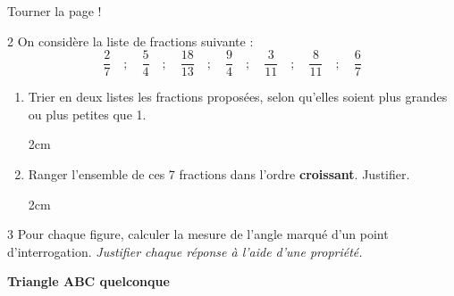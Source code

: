\documentclass[a4paper]{book}
\begin{document}
{\vfill \hfill Tourner la page !
\newpage


    \begin{exerciceNote}{2}
        On considère la liste de fractions suivante :
        \[ \frac{2}{7} \quad ; \quad \frac{5}{4} \quad ; \quad \frac{18}{13} \quad ; \quad \frac{9}{4} \quad ; \quad \frac{3}{11} \quad ; \quad \frac{8}{11} \quad ; \quad \frac{6}{7} \]
        
        \begin{enumerate}[leftmargin=*]
            \item Trier en deux listes les fractions proposées, selon qu'elles soient plus grandes ou plus petites que 1.

            \begin{ZoneReponse}{2cm}
            \end{ZoneReponse}
            
            \item Ranger l'ensemble de ces 7 fractions dans l'ordre \textbf{croissant}. Justifier.

            \begin{ZoneReponse}{2cm}
            \end{ZoneReponse}
        \end{enumerate}
    \end{exerciceNote}


    \begin{exerciceNote}{3}
        Pour chaque figure, calculer la mesure de l'angle marqué d'un point d'interrogation. \textit{Justifier chaque réponse à l'aide d'une propriété.}

        \vspace{1cm}

        \begin{minipage}{0.32\linewidth}
             \begin{center}
                \textbf{Triangle ABC quelconque} 
                
            \end{center}


\end{minipage}
\end{exerciceNote}}
\end{document}
